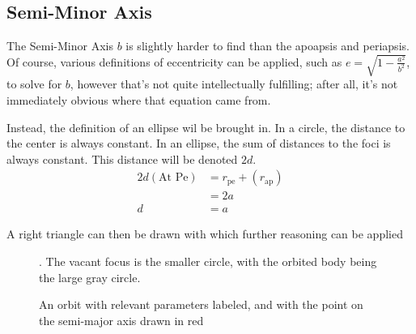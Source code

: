 \documentclass{article}
\begin{document}
\bigskip\bigskip
\subsection{Semi-Minor Axis}\label{Sec:Semi Minor Axis Geometric}

The Semi-Minor Axis $b$ is slightly harder to find than the apoapsis and periapsis. Of course, various definitions of eccentricity can be applied, such as $e=\sqrt{1-\frac{a^2}{b^2}}$, to solve for $b$, however that's not quite intellectually fulfilling; after all, it's not immediately obvious where that equation came from.

Instead, the definition of an ellipse wil be brought in. In a circle, the distance to the center is always constant. In an ellipse, the sum of distances to the foci is always constant. This distance will be denoted $2d$.
\begin{align*}
    2d(\text{At Pe}) & = r_\text{pe}+(r_\text{ap}) \\
                     & = 2a                        \\
    d                & =a
\end{align*}

A right triangle can then be drawn with which further reasoning can be applied
\begin{figure}[H]
    \centering

    \caption{An orbit with relevant parameters labeled, and with the point on the semi-major axis drawn in red}. The vacant focus is the smaller circle, with the orbited body being the large gray circle.
\end{figure}
\end{document}
